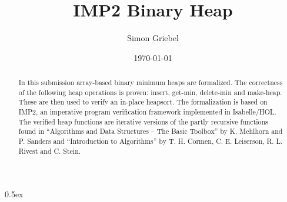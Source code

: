 \documentclass[11pt,a4paper]{article}
\begin{document}
\title{IMP2 Binary Heap}
\author{Simon Griebel}
\date{\today}
\maketitle
\begin{abstract}
In this submission array-based binary minimum heaps are formalized. The correctness of the following heap operations is proven: \mbox{insert}, get-min, delete-min and make-heap. These are then used to verify an in-place heapsort. The formalization is based on IMP2, an imperative program verification framework implemented in Isabelle/HOL. The verified heap functions are iterative versions of the partly recursive functions found in ``Algorithms and Data Structures -- The Basic Toolbox'' by  K. Mehlhorn and P. Sanders and ``Introduction to Algorithms'' by T. H. Cormen, C. E. Leiserson, R. L. Rivest and C. Stein.
\end{abstract}
\tableofcontents

\parindent 0pt\parskip 0.5ex
\newpage




\end{document}
